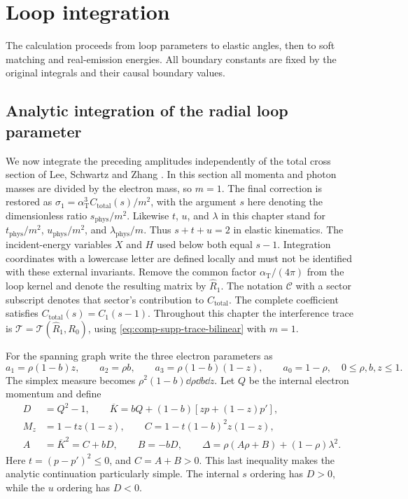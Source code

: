 \section{Loop integration}
The calculation proceeds from loop parameters to elastic angles, then to
soft matching and real-emission energies. All boundary constants are
fixed by the original integrals and their causal boundary values.

\subsection{Analytic integration of the radial loop parameter}
\label{sec:comp-supp-integrating}

We now integrate the preceding amplitudes independently of the
total cross section of Lee, Schwartz and Zhang
\cite{qed-processes-lsz}. In this section all momenta and
photon masses are divided by the electron mass, so $m=1$.
The final correction is restored as
$\sigma_1=\alpha_{\mathrm T}^3 C_{\mathrm{total}}(s)/m^2$, with the argument
$s$ here denoting the dimensionless ratio $s_{\mathrm{phys}}/m^2$.
Likewise $t$, $u$, and $\lambda$ in this chapter stand for
$t_{\mathrm{phys}}/m^2$, $u_{\mathrm{phys}}/m^2$, and
$\lambda_{\mathrm{phys}}/m$. Thus $s+t+u=2$ in elastic kinematics.
The incident-energy variables $X$ and $H$ used below both equal $s-1$.
Integration coordinates with a lowercase letter are defined locally
and must not be identified with these external invariants.
Remove the common factor $\alpha_{\mathrm T}/(4\pi)$ from the loop
kernel and denote the resulting matrix by $\widehat R_1$.
The notation $\mathcal C$ with a sector subscript denotes that sector's
contribution to $C_{\mathrm{total}}$. The complete coefficient satisfies
$C_{\mathrm{total}}(s)=C_1(s-1)$.
Throughout this chapter the interference trace is
$\mathcal T=\mathcal T(\widehat R_1,R_0)$, using
\eqref{eq:comp-supp-trace-bilinear} with $m=1$.

For the spanning graph write the three electron parameters as
\begin{equation}
 a_1=\rho(1-b)z,\qquad a_2=\rho b,\qquad
 a_3=\rho(1-b)(1-z),\qquad a_0=1-\rho,
 \quad 0\leq\rho,b,z\leq1.
\end{equation}
The simplex measure becomes $\rho^2(1-b)\dd\rho\dd b\dd z$.
Let $Q$ be the internal electron momentum and define
\begin{align}
 D&=Q^2-1,\qquad \overline K=bQ+(1-b)[zp+(1-z)p'],\\
 M_z&=1-tz(1-z),\qquad C=1-t(1-b)^2z(1-z),\\
 A&=\overline K^2=C+bD,\qquad B=-bD,\qquad
 \Delta=\rho(A\rho+B)+(1-\rho)\lambda^2.
\end{align}
Here $t=(p-p')^2\leq0$, and $C=A+B>0$.
This last inequality makes the analytic continuation particularly
simple. The internal $s$ ordering has $D>0$, while the $u$ ordering
has $D<0$.

